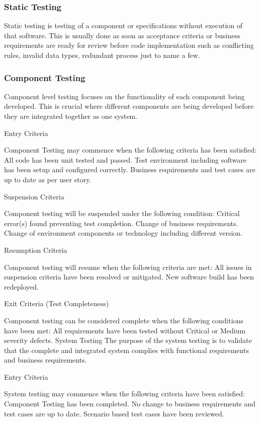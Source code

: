 \documentclass[a4paper]{article}
\begin{document}
\subsubsection{Static Testing}
Static testing is testing of a component or specifications without execution of that software.  This is usually done as soon as acceptance criteria or business requirements are ready for review before code implementation such as conflicting rules, invalid data types, redundant process just to name a few. 
\subsubsection{Component Testing}
Component level testing focuses on the functionality of each component being developed.  This is  crucial where different components are being developed before they are integrated together as one system.

Entry Criteria

Component Testing may commence when the following criteria has been satisfied:
All code has been unit tested and passed.
Test environment including software has been setup and configured correctly.
Business requirements and test cases are up to date as per user story.

Suspension Criteria

Component testing will be suspended under the following condition:
Critical error(s) found preventing test completion.
Change of business requirements.
Change of environment components or technology including different version.

Resumption Criteria

Component testing will resume when the following criteria are met:
All issues in suspension criteria have been resolved or mitigated.
New software build has been redeployed.

Exit Criteria (Test Completeness)

Component testing can be considered complete when the following conditions have been met:
All requirements have been tested without Critical or Medium severity defects.
 System Testing
The purpose of the system testing is to validate that the complete and integrated system complies with functional requirements and business requirements.

Entry Criteria

System testing may commence when the following criteria have been satisfied:
Component Testing has been completed.
No change to business requirements and test cases are up to date.
Scenario based test cases have been reviewed.
\end{document}
